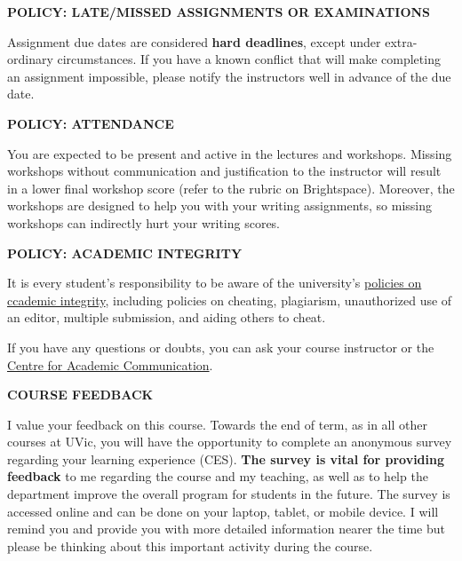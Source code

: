 \documentclass[11pt]{article}
\begin{document}
\textbf{POLICY: LATE/MISSED ASSIGNMENTS OR EXAMINATIONS}

Assignment due dates are considered \textbf{hard deadlines}, except under extra-ordinary circumstances. If you have a known conflict that will make completing an assignment impossible, please notify the instructors well in advance of the due date.

\textbf{POLICY: ATTENDANCE}

You are expected to be present and active in the lectures and workshops. Missing workshops without communication and justification to the instructor will result in a lower final workshop score (refer to the rubric on Brightspace). Moreover, the workshops are designed to help you with your writing assignments, so missing workshops can indirectly hurt your writing scores. 

\textbf{POLICY: ACADEMIC INTEGRITY}

It is every student's responsibility to be aware of the university's \href{https://web.uvic.ca/calendar/undergrad/info/regulations/academic-integrity.html}{policies on ccademic integrity}, including policies on cheating, plagiarism, unauthorized use of an editor, multiple submission, and aiding others to cheat. 

If you have any questions or doubts, you can ask your course instructor or the \href{https://uvic.ca/learningandteaching/cac}{Centre for Academic Communication}.

\begin{center}
  \textbf{COURSE FEEDBACK}
\end{center}
\smallskip
\vspace*{-.6em}
I value your feedback on this course. Towards the end of term, as in all other courses at UVic, you will have the opportunity to complete an anonymous survey regarding your learning experience (CES). \textbf{The survey is vital for providing feedback} to me regarding the course and my teaching, as well as to help the department improve the overall program for students in the future. The survey is accessed online and can be done on your laptop, tablet, or mobile device. I will remind you and provide you with more detailed information nearer the time but please be thinking about this important activity during the course.
\end{document}

